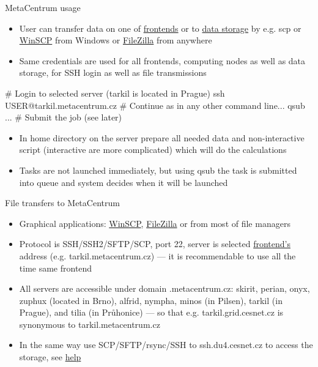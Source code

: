 \documentclass[compress, ucs, xelatex, 11pt, xcolor=x11names, aspectratio=1609,
	hyperref={
		bookmarks=true,
		unicode=true,
		colorlinks=true,
		pdftitle={HybSeq course},
		plainpages=false,
		pdfauthor={Vojtech Zeisek},
		pdfsubject={Practical processing of HybSeq target enrichment sequencing data on computing grids like MetaCentrum},
		pdfcreator={XeLaTeX},
		pdfkeywords={BASH, command line, GNU, HybSeq, Linux, MetaCentrum, sequencing shell, target enrichment},
		linkcolor=Cyan2, %
		anchorcolor=Firebrick2, %
		citecolor=Firebrick2, %
		filecolor=Firebrick2, %
		menucolor=Firebrick2, %
		urlcolor=Chartreuse2, %
		pdftex},
	url={hyphens, lowtilde} %
	]{beamer}
\renewcommand{\texttt}[1]{\colorbox{Snow4}{{\ttfamily #1}}}
\begin{document}
\begin{frame}[fragile]{MetaCentrum usage}
	\begin{itemize}
		\item User can transfer data on one of \href{https://wiki.metacentrum.cz/wiki/Frontend}{frontends} or to \href{https://du.cesnet.cz/en/prehled_protokolu_a_sluzeb_s_jejich_doporucenimi/start#protocol}{data storage} by e.g. \texttt{scp} or \href{https://winscp.net/}{WinSCP} from Windows or \href{https://filezilla-project.org/}{FileZilla} from anywhere
		\item Same credentials are used for all frontends, computing nodes as well as data storage, for SSH login as well as file transmissions
	\end{itemize}
	\vfill
	\begin{bashcode}
    # Login to selected server (tarkil is located in Prague)
    ssh USER@tarkil.metacentrum.cz
    # Continue as in any other command line...
    qsub ... # Submit the job (see later)
	\end{bashcode}
	\vfill
	\begin{itemize}
		\item In home directory on the server prepare all needed data and non-interactive script (interactive are more complicated) which will do the calculations
		\item Tasks are not launched immediately, but using \texttt{qsub} the task is submitted into queue and system decides when it will be launched
	\end{itemize}
\end{frame}

\begin{frame}{File transfers to MetaCentrum}
	\begin{itemize}
		\item Graphical applications: \href{https://winscp.net/}{WinSCP}, \href{https://filezilla-project.org/}{FileZilla} or from most of file managers
		\item Protocol is SSH/SSH2/SFTP/SCP, port 22, server is selected \href{https://wiki.metacentrum.cz/wiki/Frontend}{frontend's} address (e.g. \texttt{tarkil.metacentrum.cz}) --- it is recommendable to use all the time same frontend
		\item All servers are accessible under domain \texttt{*.metacentrum.cz}: \texttt{skirit}, \texttt{perian}, \texttt{onyx}, \texttt{zuphux} (located in Brno), \texttt{alfrid}, \texttt{nympha}, \texttt{minos} (in Pilsen), \texttt{tarkil} (in Prague), and \texttt{tilia} (in Průhonice) --- so that e.g. \texttt{tarkil.grid.cesnet.cz} is synonymous to \texttt{tarkil.metacentrum.cz}
		\item In the same way use SCP/SFTP/rsync/SSH to \texttt{ssh.du4.cesnet.cz} to access the storage, see \href{https://du.cesnet.cz/en/prehled_protokolu_a_sluzeb_s_jejich_doporucenimi/start\#protocol}{help}
	\end{itemize}
\end{frame}
\end{document}
